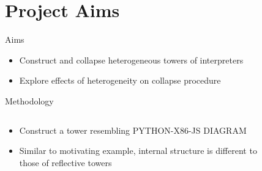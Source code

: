 \documentclass{beamer}
\begin{document}
\section{Project Aims}
\begin{frame}{Aims}
    \begin{itemize}
        \item Construct and collapse heterogeneous towers of interpreters
        \item Explore effects of heterogeneity on collapse procedure
    \end{itemize}
\end{frame}

\begin{frame}{Methodology}
      \begin{columns}
    \begin{column}{0.5\textwidth}
    \begin{itemize}
        \item Construct a tower resembling PYTHON-X86-JS DIAGRAM
        \item Similar to motivating example, internal structure is different to those of reflective towers
    \end{itemize}
    \end{column}
    \begin{column}{0.5\textwidth}
      \begin{figure}
        \centering
      \end{figure}
    \end{column}
  \end{columns}
\end{frame}
\end{document}
